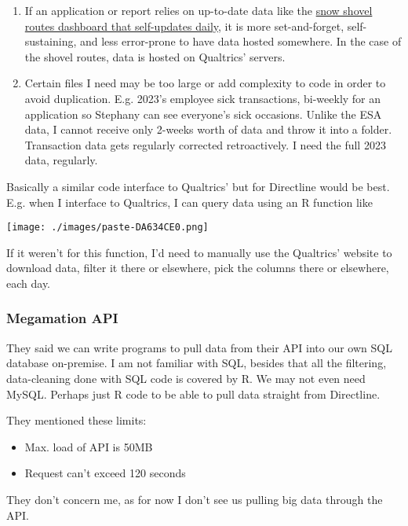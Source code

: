 \documentclass[
  letterpaper,
  DIV=11,
  numbers=noendperiod,
  oneside]{scrreprt}
\providecommand{\tightlist}{%
  \setlength{\itemsep}{0pt}\setlength{\parskip}{0pt}}\usepackage{longtable,booktabs,array}
\begin{document}
\begin{enumerate}
\def\labelenumi{\arabic{enumi}.}
\tightlist
\item
  If an application or report relies on up-to-date data like the
  \href{https://physical-resources.shinyapps.io/shovelapp/}{snow shovel
  routes dashboard that self-updates daily}, it is more set-and-forget,
  self-sustaining, and less error-prone to have data hosted somewhere.
  In the case of the shovel routes, data is hosted on Qualtrics'
  servers.
\item
  Certain files I need may be too large or add complexity to code in
  order to avoid duplication. E.g. 2023's employee sick transactions,
  bi-weekly for an application so Stephany can see everyone's sick
  occasions. Unlike the ESA data, I cannot receive only 2-weeks worth of
  data and throw it into a folder. Transaction data gets regularly
  corrected retroactively. I need the full 2023 data, regularly.
\end{enumerate}

Basically a similar code interface to Qualtrics' but for Directline
would be best. E.g. when I interface to Qualtrics, I can query data
using an R function like

\texttt{[image: ./images/paste-DA634CE0.png]}

If it weren't for this function, I'd need to manually use the Qualtrics'
website to download data, filter it there or elsewhere, pick the columns
there or elsewhere, each day.

\hypertarget{megamation-api}{%
\subsubsection{Megamation API}\label{megamation-api}}

They said we can write programs to pull data from their API into our own
SQL database on-premise. I am not familiar with SQL, besides that all
the filtering, data-cleaning done with SQL code is covered by R. We may
not even need MySQL. Perhaps just R code to be able to pull data
straight from Directline.

They mentioned these limits:

\begin{itemize}
\item
  Max. load of API is 50MB
\item
  Request can't exceed 120 seconds
\end{itemize}

They don't concern me, as for now I don't see us pulling big data
through the API.
\end{document}
